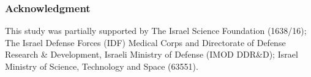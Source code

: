 \documentclass[10pt,journal,compsoc]{IEEEtran}
\begin{document}

\subsubsection*{\textbf{Acknowledgment}}
\small This study was partially supported by The Israel Science Foundation (1638/16); The Israel Defense Forces (IDF) Medical Corps and Directorate of Defense Research \& Development, Israeli Ministry of Defense (IMOD DDR\&D); Israel Ministry of Science, Technology and Space (63551).
\end{document}
